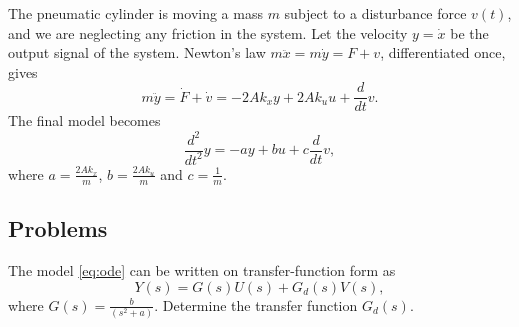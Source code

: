 \documentclass[letterpaper,12pt]{scrartcl}
\newenvironment{exercise}[1][Exercise]{\begin{trivlist} \item[\hskip
    \labelsep {\stepcounter{exerctr}\bfseries #1
      \arabic{exerctr}}]}{\end{trivlist}\vspace{10mm}}
\newcounter{exerctr}
\newcommand{\bmpl}{\begin{minipage}[t]{\textwidth}}
\newcommand{\emp}{\end{minipage}}
\begin{document}
The pneumatic cylinder is moving a mass $m$ subject to a disturbance force $v(t)$,  and we are neglecting any friction in the system. Let the velocity $y=\dot{x}$ be the output signal of the system. Newton's law \( m\ddot{x} = m\dot{y} = F+v\), differentiated once, gives 
\[ m\ddot{y} = \dot{F} + \dot{v} = -2Ak_{x}y + 2Ak_{u}u + \frac{d}{dt} v.\] The final model becomes
\begin{equation}
  \frac{d^2}{dt^2} y = -a y + bu + c\frac{d}{dt}v, 
  \label{eq:ode}
\end{equation}
where $a = \frac{2Ak_{x}}{m}$, $b=\frac{2Ak_{u}}{m}$ and $c = \frac{1}{m}$. 

\subsection*{Problems}

\begin{exercise}
 The model \eqref{eq:ode} can be written on transfer-function form as 
\begin{equation}
Y(s) = G(s)U(s) + G_d(s)V(s),
\label{eq:trf}
\end{equation}
where \( G(s) = \frac{b}{(s^2 + a)}. \)
Determine the transfer function $G_d(s)$.

\noindent
\fbox{
\bmpl
\textbf{ Calculations:}\\
\vspace*{50mm}
\emp}
\end{exercise}
\end{document}
